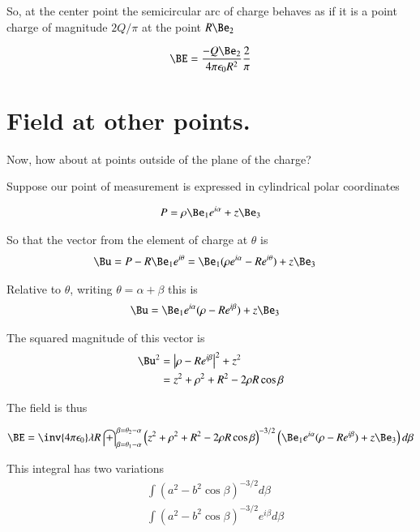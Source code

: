 \documentclass{article}
\begin{document}
So, at the center point the semicircular arc of charge behaves as if it is a point charge of magnitude $2Q/\pi$ at the point $R \Be_2$

\begin{align}\label{eqn:semicircleAtCenter}
\BE = \frac{-Q \Be_2}{ 4 \pi \epsilon_0 R^2 } \frac{2}{\pi}
\end{align}

\section{ Field at other points. }

Now, how about at points outside of the plane of the charge?

Suppose our point of measurement is expressed in cylindrical polar coordinates

\begin{align*}
P = \rho \Be_1 e^{i\alpha} + z \Be_3
\end{align*}

So that the vector from the element of charge at $\theta$ is
\begin{align*}
\Bu = P - R \Be_1 e^{i\theta} &= \Be_1 (\rho e^{i\alpha} -R e^{i\theta}) + z \Be_3
\end{align*}

Relative to $\theta$, writing $\theta = \alpha + \beta$ this is
\begin{align*}
\Bu &= \Be_1 e^{i\alpha} (\rho -R e^{i\beta}) + z \Be_3
\end{align*}

The squared magnitude of this vector is
\begin{align*}
\Bu^2
&= \Abs{\rho -R e^{i\beta}}^2 + z^2 \\
&= z^2 + \rho^2 + R^2 -2 \rho R \cos\beta \\
\end{align*}

The field is thus

\begin{align}\label{eqn:fieldAtP}
\BE = \inv{4 \pi \epsilon_0} \lambda R 
\int_{\beta=\theta_1 -\alpha}^{\beta=\theta_2-\alpha}
{
\left(z^2 + \rho^2 + R^2 -2 \rho R \cos\beta\right)
}^{-3/2}
\left(\Be_1 e^{i\alpha} (\rho -R e^{i\beta}) + z \Be_3\right)
d\beta
\end{align}

This integral has two variations
\begin{align*}
&\int { \left(a^2 - b^2\cos\beta\right) }^{-3/2} d\beta \\
&\int { \left(a^2 - b^2\cos\beta\right) }^{-3/2} e^{i\beta} d\beta \\
\end{align*}
\end{document}
